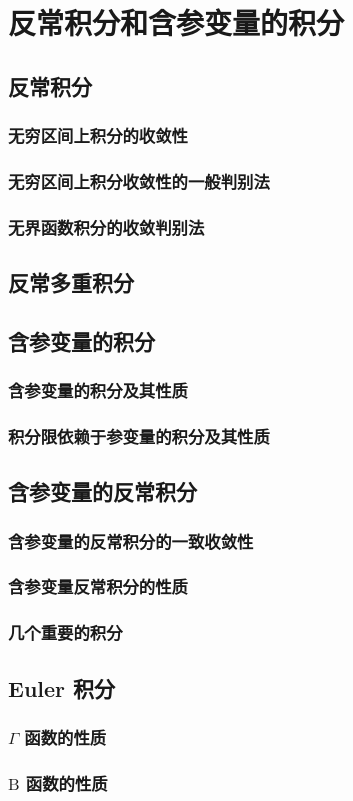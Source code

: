 \section{反常积分和含参变量的积分}

\subsection{反常积分}
\subsubsection{无穷区间上积分的收敛性}
\subsubsection{无穷区间上积分收敛性的一般判别法}
\subsubsection{无界函数积分的收敛判别法}

\subsection{反常多重积分}

\subsection{含参变量的积分}
\subsubsection{含参变量的积分及其性质}
\subsubsection{积分限依赖于参变量的积分及其性质}

\subsection{含参变量的反常积分}
\subsubsection{含参变量的反常积分的一致收敛性}
\subsubsection{含参变量反常积分的性质}
\subsubsection{几个重要的积分}

\subsection{Euler 积分}
\subsubsection{$\Gamma$ 函数的性质}
\subsubsection{$\text{B}$ 函数的性质}
